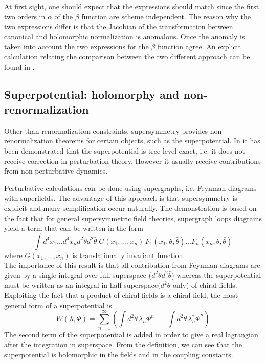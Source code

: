 At first sight, one should expect that the expressions should match since the first two orders in $\alpha$ of the $\beta$ function are scheme independent. 
The reason why the two expressions differ is that the Jacobian of the transformation between canonical and holomorphic normalization is anomalous. 
Once the anomaly is taken into account the two expressions for the $\beta$ function agree. 
An explicit calculation relating the comparison between the two different approach can be found in \cite{ArkaniHamed:1997mj}.



















\subsection{Superpotential: holomorphy and non-renormalization}
Other than renormalization constraints, supersymmetry provides non-renormalization theorems for certain objects, such as the superpotential.
In \cite{Grisaru:1979wc} it has been demonstrated that the superpotential is tree-level exact, i.e. it does not receive correction in perturbation theory. 
However it usually receive contributions from non perturbative dynamics.

Perturbative calculations can be done using supergraphs, i.e. Feynman diagrams with superfields. 
The advantage of this approach is that supersymmetry is explicit and many semplification occur naturally. 
The demonstration is based on the fact that for general supersymmetric field theories, supergraph loops diagrams yield a term that can be written in the form
\begin{equation}
\int  d^4 x_1 \dots d^4 x_n d^2 \theta d^2 \bar{\theta} \; G (x_1 , \dots , x_n) \,F_1 ( x_1, \theta, \bar{\theta}) \dots  F_n ( x_n, \theta, \bar{\theta}) 
\end{equation} 
where $G (x_1 , \dots , x_n) $ is translationally invariant function.\\
The importance of this result is that all contribution from Feynman diagrams are given by a single integral over full superspace ($d^2 \theta d^2 \bar{\theta} $) whereas the superpotential must be written as an integral in half-superspace($d^2 \theta $ only) of chiral fields.
Exploiting the fact that a product of chiral fields is a chiral field, the most general form of a superpotential is 
\begin{equation}
 W (\lambda, \Phi) = \sum_{n=1}^{\infty} \left( \int d^2 \theta \, \lambda_n \Phi^n  \; +\;  \int d^2 \bar{\theta} \, \lambda_n^{\dagger} \bar{\Phi}^n \right)
 \end{equation} 
 The second term of the superpotential is added in order to give a real lagrangian after the integration in superspace.
From the definition, we can see that the superpotential is holomorphic in the fields and in the coupling constants.

